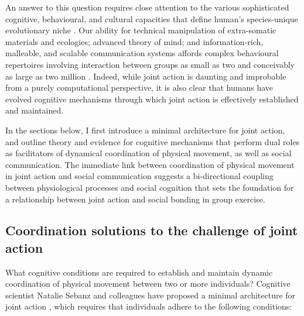 \begin{CJK}{UTF8}{gbsn}
An answer to this question requires close attention to the various sophisticated cognitive, behavioural, and cultural capacities that define human's species-unique evolutionary niche \citep{Roepstorff2010,Clark2015,Fuentes2016}.  Our ability for technical manipulation of extra-somatic materials and ecologies; advanced theory of mind; and information-rich, malleable, and scalable communication systems affords complex behavioural repertoires involving interaction between groups as small as two and conceivably as large as two million \citep{Pacherie2012,Nowak2017}.  Indeed, while joint action is daunting and improbable from a purely computational perspective, it is also clear that humans have evolved cognitive mechanisms through which joint action is effectively established and maintained.

In the sections below, I first introduce a minimal architecture for joint action, and outline theory and evidence for cognitive mechanisms that perform dual roles as facilitators of dynamical coordination of physical movement, as well as social communication.  The immediate link between coordination of physical movement in joint action and social communication suggests a bi-directional coupling between physiological processes and social cognition that sets the foundation for a relationship between joint action and social bonding in group exercise.



\subsection{Coordination solutions to the challenge of joint action}

What cognitive conditions are required to establish and maintain dynamic coordination of physical movement between two or more individuals?  Cognitive scientist Natalie Sebanz and colleagues have proposed a minimal architecture for joint action \citep{Sebanz2006,Vesper2010}, which requires that individuals adhere to the following conditions:


\end{CJK}
